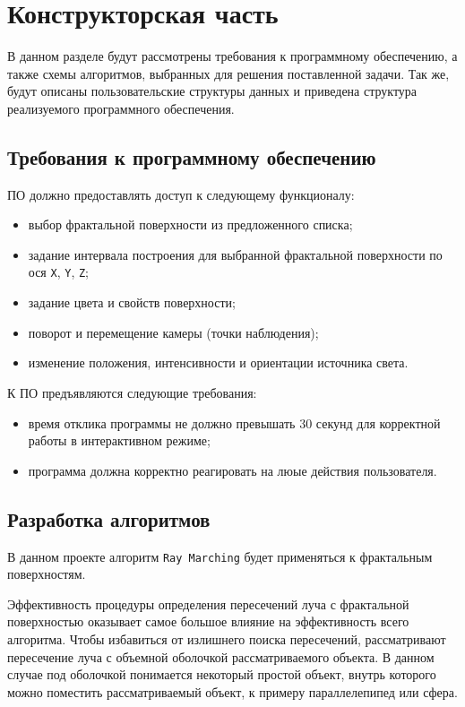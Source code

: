 \chapter{Конструкторская часть}

В данном разделе будут рассмотрены требования к программному обеспечению, а также схемы алгоритмов, выбранных для решения поставленной задачи. Так же, будут описаны пользовательские структуры данных и приведена структура реализуемого программного обеспечения.

\section{Требования к программному обеспечению}

ПО должно предоставлять доступ к следующему функционалу:

\begin{itemize}
    \item выбор фрактальной поверхности из предложенного списка;
    \item задание интервала построения для выбранной фрактальной поверхности по ося \texttt{X}, \texttt{Y}, \texttt{Z};
    \item задание цвета и свойств поверхности;
    \item поворот и перемещение камеры (точки наблюдения);
    \item изменение положения, интенсивности и ориентации источника света.
\end{itemize}

К ПО предъявляются следующие требования:

\begin{itemize}
    \item время отклика программы не должно превышать 30 секунд для корректной работы в интерактивном режиме;
    \item программа должна корректно реагировать на люые действия пользователя.
\end{itemize}

\section{Разработка алгоритмов}

В данном проекте алгоритм \texttt{Ray Marching} будет применяться к фрактальным поверхностям.

Эффективность процедуры определения пересечений луча с фрактальной поверхностью оказывает самое большое влияние на эффективность всего алгоритма. Чтобы избавиться от излишнего поиска пересечений, рассматривают пересечение луча с объемной оболочкой рассматриваемого объекта. В данном случае под оболочкой понимается некоторый простой объект, внутрь которого можно поместить рассматриваемый объект, к примеру параллелепипед или сфера.

